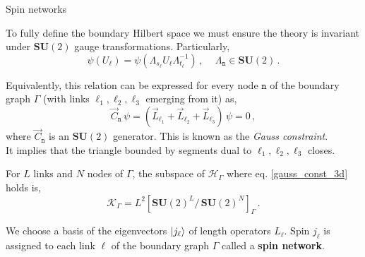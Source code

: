 \documentclass{beamer}
\newcommand\boldtext[1]{\textcolor{bolds}{\textbf{#1}}}
\newcommand\italictext[1]{\textcolor{italics}{\textit{#1}}}
\begin{document}
\begin{frame}{Spin networks}
    \begin{list}{\maltese}{\leftmargin=1em \itemindent=0em}
        \item<1-> To fully define the boundary Hilbert space we must ensure the theory is invariant under $\mathbf{SU}(2)$ gauge transformations. Particularly,
        \begin{equation}
            \psi(U_\ell)=\psi(\Lambda_{s_\ell}U_\ell\Lambda_{t_\ell}^{-1})\,,\,\,\,\,\,\,\, \Lambda_{\mathtt{n}}\in\mathbf{SU}(2)\,.
        \end{equation}
        \item<2-> Equivalently, this relation can be expressed for every node $\mathtt{n}$ of the boundary graph $\Gamma$ (with links $\ell_1,\ell_2,\ell_3$ emerging from it) as,
        \begin{equation}\label{gauss_const_3d}
            \vec{C}_\mathtt{n}\,\psi=(\vec{L}_{\ell_1}+\vec{L}_{\ell_2}+\vec{L}_{\ell_3})\,\psi=0\,,
        \end{equation}
        where $\vec{C}_\mathtt{n}$ is an $\mathbf{SU}(2)$ generator. This is known as the \italictext{Gauss constraint}.\\
        It implies that the triangle bounded by segments dual to $\ell_1,\ell_2,\ell_3$ closes.
        \item<3-> For $L$ links and $N$ nodes of $\Gamma$, the subspace of $\mathcal{H}_\Gamma$ where eq. \ref{gauss_const_3d} holds is,
        \begin{equation}
            \mathcal{K}_\Gamma=L^2[{\mathbf{SU}(2)}^L/\,{\mathbf{SU}(2)}^N]_\Gamma\,.
        \end{equation}
        \item<4-> We choose a basis of the eigenvectors $\ket{j_\ell}$ of length operators $L_\ell$. Spin $j_\ell$ is assigned to each link $\ell$ of the boundary graph $\Gamma$ called a \boldtext{spin network}.
    \end{list}
\end{frame}
\end{document}

